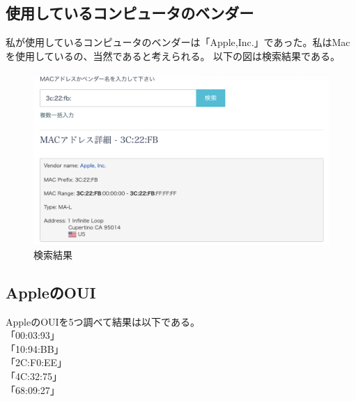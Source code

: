\documentclass[dvipdfmx,autodetect-engine,titlepage]{jsarticle}
\begin{document}
\subsection{使用しているコンピュータのベンダー}
私が使用しているコンピュータのベンダーは「Apple,Inc.」であった。私はMacを使用しているの、当然であると考えられる。
以下の図は検索結果である。

\begin{figure}[h]
  \centering
  \includegraphics[scale=0.3]{SS2.png}
  \caption{検索結果}
\end{figure}

\subsection{AppleのOUI}
AppleのOUIを5つ調べて結果は以下である。\\
「00:03:93」\\「10:94:BB」\\「2C:F0:EE」\\「4C:32:75」\\「68:09:27」
\end{document}

